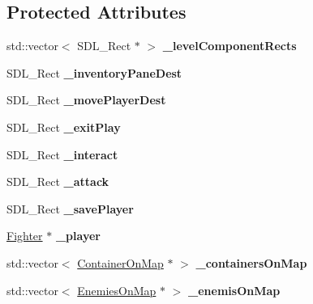 \subsection*{Protected Attributes}
\begin{DoxyCompactItemize}
\item 
\hypertarget{class_pre_built_level_a0ad1ddb709d1134c31749bdedda1ec4a}{}\label{class_pre_built_level_a0ad1ddb709d1134c31749bdedda1ec4a} 
std\+::vector$<$ S\+D\+L\+\_\+\+Rect $\ast$ $>$ {\bfseries \+\_\+level\+Component\+Rects}
\item 
\hypertarget{class_pre_built_level_ad20d575f1727d070b27b3baf7a0c4706}{}\label{class_pre_built_level_ad20d575f1727d070b27b3baf7a0c4706} 
S\+D\+L\+\_\+\+Rect {\bfseries \+\_\+inventory\+Pane\+Dest}
\item 
\hypertarget{class_pre_built_level_a812edb421a0f77672e772a7a6e4e0a09}{}\label{class_pre_built_level_a812edb421a0f77672e772a7a6e4e0a09} 
S\+D\+L\+\_\+\+Rect {\bfseries \+\_\+move\+Player\+Dest}
\item 
\hypertarget{class_pre_built_level_a0cbf9d08b7fcba3c500092b71baabdbb}{}\label{class_pre_built_level_a0cbf9d08b7fcba3c500092b71baabdbb} 
S\+D\+L\+\_\+\+Rect {\bfseries \+\_\+exit\+Play}
\item 
\hypertarget{class_pre_built_level_a58bfd4f0b1261029643f832486046ee0}{}\label{class_pre_built_level_a58bfd4f0b1261029643f832486046ee0} 
S\+D\+L\+\_\+\+Rect {\bfseries \+\_\+interact}
\item 
\hypertarget{class_pre_built_level_ab10520b34623c3f2bad2376091a85ebd}{}\label{class_pre_built_level_ab10520b34623c3f2bad2376091a85ebd} 
S\+D\+L\+\_\+\+Rect {\bfseries \+\_\+attack}
\item 
\hypertarget{class_pre_built_level_ac548cf0eb963c29aedf7d930a9828e2f}{}\label{class_pre_built_level_ac548cf0eb963c29aedf7d930a9828e2f} 
S\+D\+L\+\_\+\+Rect {\bfseries \+\_\+save\+Player}
\item 
\hypertarget{class_pre_built_level_a2b17bc23df363f269fedf0aceafc9a02}{}\label{class_pre_built_level_a2b17bc23df363f269fedf0aceafc9a02} 
\hyperlink{class_fighter}{Fighter} $\ast$ {\bfseries \+\_\+player}
\item 
\hypertarget{class_pre_built_level_a757b4089f043d4cef9c24a19b24811fe}{}\label{class_pre_built_level_a757b4089f043d4cef9c24a19b24811fe} 
std\+::vector$<$ \hyperlink{struct_container_on_map}{Container\+On\+Map} $\ast$ $>$ {\bfseries \+\_\+containers\+On\+Map}
\item 
\hypertarget{class_pre_built_level_ae816d9cfc76becdd0f24fe281a909884}{}\label{class_pre_built_level_ae816d9cfc76becdd0f24fe281a909884} 
std\+::vector$<$ \hyperlink{struct_enemies_on_map}{Enemies\+On\+Map} $\ast$ $>$ {\bfseries \+\_\+enemis\+On\+Map}
\end{DoxyCompactItemize}
